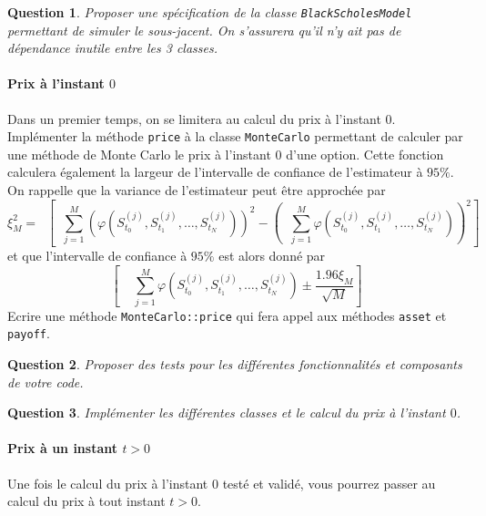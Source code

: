 \documentclass[a4paper,11pt]{article}
\def\inv#1{\mathop{\frac{1}{ #1}}\nolimits}
\def\expp#1{\mathop {\mathrm{e}^{ #1}}}
\def\var#1{{\tt #1}}
\newtheorem{question}{Question}
\begin{document}
\begin{question}
  Proposer une spécification de la classe \verb!BlackScholesModel! permettant de simuler le sous-jacent. On s'assurera qu'il n'y ait pas de dépendance inutile entre les 3 classes.
\end{question}


\paragraph{Prix à l'instant $0$}

Dans un premier temps, on se limitera au calcul du prix à l'instant $0$.  Implémenter la méthode \var{price} à la classe \var{MonteCarlo} permettant de calculer par une méthode de Monte Carlo le prix à l'instant $0$ d'une option.  Cette fonction calculera également la largeur de l'intervalle de confiance de l'estimateur à $95\%$. On rappelle que la variance de l'estimateur peut être approchée par
\begin{equation*}
  \xi_M^2 = \expp{-2rT} \left[\inv{M} \sum_{j=1}^M (\varphi(S_{t_0}^{(j)},
  S_{t_1}^{(j)}, \dots, S_{t_N}^{(j)}))^2 - \left(\inv{M} \sum_{j=1}^M
  \varphi(S_{t_0}^{(j)}, S_{t_1}^{(j)}, \dots, S_{t_N}^{(j)}) \right)^2 \right]
\end{equation*}
et que l'intervalle de confiance à $95\%$ est alors donné par
\begin{equation*}
  \left[\expp{-rT} \inv{M} \sum_{j=1}^M \varphi(S_{t_0}^{(j)}, S_{t_1}^{(j)}, \dots,
  S_{t_N}^{(j)}) \pm \frac{1.96 \xi_M}{\sqrt{M}} \right]
\end{equation*}
Ecrire une méthode \var{MonteCarlo::price} qui fera appel aux méthodes \var{asset} et
\var{payoff}.

\begin{question}
  Proposer des tests pour les différentes fonctionnalités et composants de votre code.
\end{question}

\begin{question}
  Implémenter les différentes classes et le calcul du prix à l'instant $0$.
\end{question}

\paragraph{Prix à un instant $t > 0$}

Une fois le calcul du prix à l'instant $0$ testé et validé, vous pourrez passer au calcul du prix à tout instant $t > 0$. \\
\end{document}
